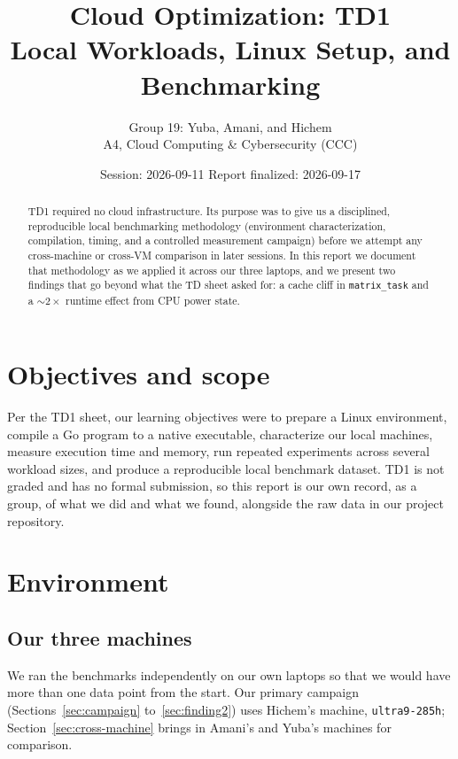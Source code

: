 \documentclass[11pt]{article}
\title{Cloud Optimization: TD1\\
\large Local Workloads, Linux Setup, and Benchmarking}
\author{Group 19: Yuba, Amani, and Hichem \\ A4, Cloud Computing \& Cybersecurity (CCC)}
\date{Session: 2026-09-11 \quad Report finalized: 2026-09-17}
\newcommand{\code}[1]{\texttt{#1}}
\begin{document}
\maketitle

\begin{abstract}
TD1 required no cloud infrastructure. Its purpose was to give us a disciplined, reproducible
local benchmarking methodology (environment characterization, compilation, timing, and a
controlled measurement campaign) before we attempt any cross-machine or cross-VM comparison in
later sessions. In this report we document that methodology as we applied it across our three
laptops, and we present two findings that go beyond what the TD sheet asked for: a cache cliff in
\code{matrix\_task} and a $\sim\!2\times$ runtime effect from CPU power state.
\end{abstract}

\clearpage
\setcounter{tocdepth}{1}
\tableofcontents
\clearpage

\section{Objectives and scope}
Per the TD1 sheet, our learning objectives were to prepare a Linux environment, compile a Go
program to a native executable, characterize our local machines, measure execution time and
memory, run repeated experiments across several workload sizes, and produce a reproducible local
benchmark dataset. TD1 is not graded and has no formal submission, so this report is our own
record, as a group, of what we did and what we found, alongside the raw data in our project
repository.

\section{Environment}

\subsection{Our three machines}
We ran the benchmarks independently on our own laptops so that we would have more than one data
point from the start. Our primary campaign (Sections~\ref{sec:campaign}
to~\ref{sec:finding2}) uses Hichem's machine, \code{ultra9-285h}; Section~\ref{sec:cross-machine}
brings in Amani's and Yuba's machines for comparison.
\end{document}
